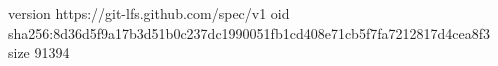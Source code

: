 version https://git-lfs.github.com/spec/v1
oid sha256:8d36d5f9a17b3d51b0c237dc1990051fb1cd408e71cb5f7fa7212817d4cea8f3
size 91394
